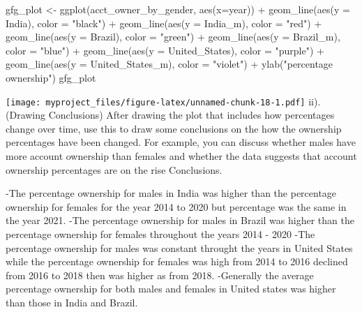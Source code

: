 \documentclass[
]{article}
\newenvironment{Shaded}{\begin{snugshade}}{\end{snugshade}}
\newcommand{\AttributeTok}[1]{\textcolor[rgb]{0.77,0.63,0.00}{#1}}
\newcommand{\FunctionTok}[1]{\textcolor[rgb]{0.00,0.00,0.00}{#1}}
\newcommand{\NormalTok}[1]{#1}
\newcommand{\OtherTok}[1]{\textcolor[rgb]{0.56,0.35,0.01}{#1}}
\newcommand{\SpecialCharTok}[1]{\textcolor[rgb]{0.00,0.00,0.00}{#1}}
\newcommand{\StringTok}[1]{\textcolor[rgb]{0.31,0.60,0.02}{#1}}
\begin{document}
\begin{Shaded}
\begin{Highlighting}[]
\NormalTok{gfg\_plot }\OtherTok{\textless{}{-}} \FunctionTok{ggplot}\NormalTok{(acct\_owner\_by\_gender, }\FunctionTok{aes}\NormalTok{(}\AttributeTok{x=}\NormalTok{year)) }\SpecialCharTok{+}
\FunctionTok{geom\_line}\NormalTok{(}\FunctionTok{aes}\NormalTok{(}\AttributeTok{y =}\NormalTok{ India), }\AttributeTok{color =} \StringTok{"black"}\NormalTok{) }\SpecialCharTok{+}
\FunctionTok{geom\_line}\NormalTok{(}\FunctionTok{aes}\NormalTok{(}\AttributeTok{y =}\NormalTok{ India\_m), }\AttributeTok{color =} \StringTok{"red"}\NormalTok{) }\SpecialCharTok{+}
\FunctionTok{geom\_line}\NormalTok{(}\FunctionTok{aes}\NormalTok{(}\AttributeTok{y =}\NormalTok{ Brazil), }\AttributeTok{color =} \StringTok{"green"}\NormalTok{) }\SpecialCharTok{+}
\FunctionTok{geom\_line}\NormalTok{(}\FunctionTok{aes}\NormalTok{(}\AttributeTok{y =}\NormalTok{ Brazil\_m), }\AttributeTok{color =} \StringTok{"blue"}\NormalTok{) }\SpecialCharTok{+}
\FunctionTok{geom\_line}\NormalTok{(}\FunctionTok{aes}\NormalTok{(}\AttributeTok{y =}\NormalTok{ United\_States), }\AttributeTok{color =} \StringTok{"purple"}\NormalTok{) }\SpecialCharTok{+}
\FunctionTok{geom\_line}\NormalTok{(}\FunctionTok{aes}\NormalTok{(}\AttributeTok{y =}\NormalTok{ United\_States\_m), }\AttributeTok{color =} \StringTok{"violet"}\NormalTok{) }\SpecialCharTok{+}
\FunctionTok{ylab}\NormalTok{(}\StringTok{"percentage ownership"}\NormalTok{)}
\NormalTok{gfg\_plot}
\end{Highlighting}
\end{Shaded}

\texttt{[image: myproject\_files/figure-latex/unnamed-chunk-18-1.pdf]}
ii). (Drawing Conclusions) After drawing the plot that includes how
percentages change over time, use this to draw some conclusions on the
how the ownership percentages have been changed. For example, you can
discuss whether males have more account ownership than females and
whether the data suggests that account ownership percentages are on the
rise Conclusions.

-The percentage ownership for males in India was higher than the
percentage ownership for females for the year 2014 to 2020 but
percentage was the same in the year 2021. -The percentage ownership for
males in Brazil was higher than the percentage ownership for females
throughout the years 2014 - 2020 -The percentage ownership for males was
constant throught the years in United States while the percentage
ownership for females was high from 2014 to 2016 declined from 2016 to
2018 then was higher as from 2018. -Generally the average percentage
ownership for both males and females in United states was higher than
those in India and Brazil.
\end{document}
